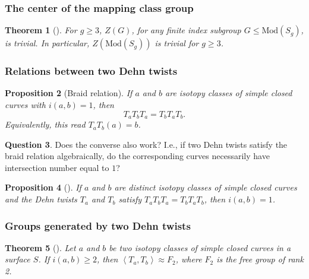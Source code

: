 \documentclass[reqno]{amsart}
\newtheorem{theorem}{Theorem}[section]
\newtheorem{proposition}[theorem]{Proposition}
\theoremstyle{definition}
\newtheorem{question}[theorem]{Question}
\theoremstyle{remark}
\newcommand{\Mod}{{\mathrm{Mod}}}
\begin{document}
\subsubsection{The center of the mapping class group}

\begin{theorem}[]
    For $g \ge 3$, $Z\left( G \right) $, for
    any finite index subgroup $G \le \Mod (S_g)$, is trivial.
    In particular, $Z\left( \Mod(S_g) \right) $ is trivial
    for $g\ge 3$.
\end{theorem}

\subsubsection{Relations between two Dehn twists}

\begin{proposition}[Braid relation]\label{dehn-braid-relation}
    If $a$ and $b$ are isotopy classes of simple closed
    curves with $i(a,b) = 1$, then
    \[
    T_a T_b T_a = T_b T_a T_b.
    \] 
    Equivalently, this read
    $T_a T_b(a) = b$.
\end{proposition}

\begin{question}
    Does the converse also work? I.e., if two Dehn twists
    satisfy the braid relation algebraically, do the
    corresponding curves necessarily have intersection
    number equal to $1$?
\end{question}

\begin{proposition}[]
    If $a$ and $b$ are distinct isotopy classes of simple closed
    curves and the Dehn twists $T_a$ and $T_b$ satisfy
    $T_a T_b T_a = T_b T_a T_b$, then
    $i(a,b) = 1$.
\end{proposition}

\subsubsection*{Groups generated by two Dehn twists}

\begin{theorem}[]
    Let $a$ and $b$ be two isotopy classes of simple closed
    curves in a surface $S$. If $i(a,b) \ge 2$, then
    $\left<T_a ,T_b \right> \approx F_2$, where
    $F_2$ is the free group of rank 2.
\end{theorem}
\end{document}
